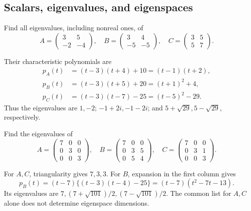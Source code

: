 \subsection*{Scalars, eigenvalues, and eigenspaces}


\begin{problem}\label{ex:08:two-eigenvalues}
Find all eigenvalues, including nonreal ones, of
\[
 A=\begin{pmatrix}3&5\\-2&-4\end{pmatrix},\quad
 B=\begin{pmatrix}3&4\\-5&-5\end{pmatrix},\quad
 C=\begin{pmatrix}3&5\\5&7\end{pmatrix}.
\]
\end{problem}
\begin{solution}
Their characteristic polynomials are
\[
 \begin{aligned}
 p_A(t)&=(t-3)(t+4)+10=(t-1)(t+2),\\
 p_B(t)&=(t-3)(t+5)+20=(t+1)^2+4,\\
 p_C(t)&=(t-3)(t-7)-25=(t-5)^2-29.
 \end{aligned}
\]
Thus the eigenvalues are \(1,-2\); \(-1+2i,-1-2i\); and
\(5+\sqrt{29},5-\sqrt{29}\), respectively.
\end{solution}

\begin{problem}\label{ex:08:three-eigenvalues}
Find the eigenvalues of
\[
 A=\begin{pmatrix}7&0&0\\0&3&0\\0&0&3\end{pmatrix},\quad
 B=\begin{pmatrix}7&0&0\\0&3&5\\0&5&4\end{pmatrix},\quad
 C=\begin{pmatrix}7&0&0\\0&3&1\\0&0&3\end{pmatrix}.
\]
\end{problem}
\begin{solution}
For \(A,C\), triangularity gives \(7,3,3\).
For \(B\), expansion in the first column gives
\[
 p_B(t)=(t-7)\{(t-3)(t-4)-25\}=(t-7)(t^2-7t-13).
\]
Its eigenvalues are \(7,(7+\sqrt{101})/2,(7-\sqrt{101})/2\).
The common list for \(A,C\) alone does not determine eigenspace dimensions.
\end{solution}

